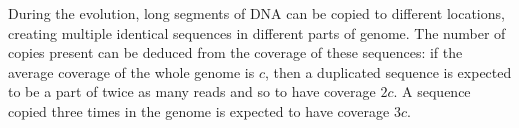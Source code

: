 
During the evolution, long segments of DNA can be copied to different locations, 
creating multiple identical sequences in different parts of genome. The number of copies present 
can be deduced from the coverage of these sequences: if the average coverage of the whole genome 
is $c$, then a duplicated sequence is expected to be a part of twice as many reads and so to
have coverage $2c$. A sequence copied three times in the genome is expected to have coverage $3c$.
